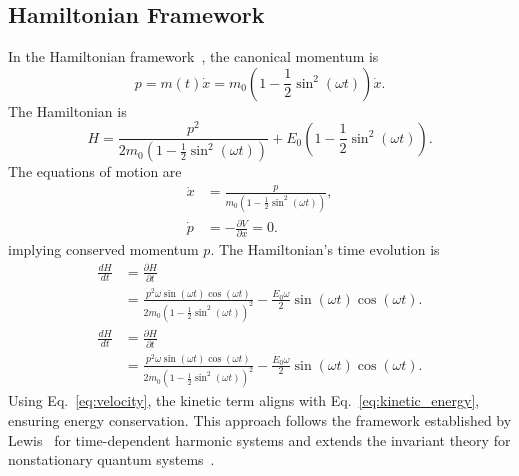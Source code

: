 \documentclass[%
 reprint,
 amsmath,amssymb,
 aps,
]{revtex4-1}
\numberwithin{equation}{section}%
\begin{document}
\subsection{Hamiltonian Framework}

In the Hamiltonian framework~\cite{goldstein2002}, the canonical momentum is
\begin{equation}
p = m(t) \dot{x} = m_0 \left( 1 - \frac{1}{2} \sin^2 (\omega t) \right) \dot{x}.
\end{equation}
The Hamiltonian is
\begin{equation}
H = \frac{p^2}{2 m_0 \left( 1 - \frac{1}{2} \sin^2 (\omega t) \right)} + E_0 \left( 1 - \frac{1}{2} \sin^2 (\omega t) \right).
\label{eq:hamiltonian}
\end{equation}
The equations of motion are
\begin{equation}
\begin{split}
\dot{x} &= \frac{p}{m_0 \left( 1 - \frac{1}{2} \sin^2 (\omega t) \right)}, \\
\dot{p} &= -\frac{\partial V}{\partial x} = 0.
\end{split}
\end{equation}
implying conserved momentum \( p \). The Hamiltonian's time evolution is
\begin{equation}
\begin{split}
\frac{dH}{dt} &= \frac{\partial H}{\partial t} \\
&=  \frac{p^2 \omega \sin (\omega t) \cos (\omega t)}{2 m_0 \left( 1 - \frac{1}{2} \sin^2 (\omega t) \right)^2} - \frac{E_0 \omega}{2} \sin (\omega t) \cos (\omega t).
\end{split}
\end{equation}
\begin{equation}
\begin{split}
\frac{dH}{dt} &= \frac{\partial H}{\partial t} \\
&= \frac{p^2 \omega \sin (\omega t) \cos (\omega t)}{2 m_0 \left( 1 - \frac{1}{2} \sin^2 (\omega t) \right)^2} - \frac{E_0 \omega}{2} \sin (\omega t) \cos (\omega t).
\end{split}
\end{equation}
Using Eq.~\eqref{eq:velocity}, the kinetic term aligns with Eq.~\eqref{eq:kinetic_energy}, ensuring energy conservation. This approach follows the framework established by Lewis~\cite{lewis1969} for time-dependent harmonic systems and extends the invariant theory for nonstationary quantum systems~\cite{dodonov2000}.
\end{document}
